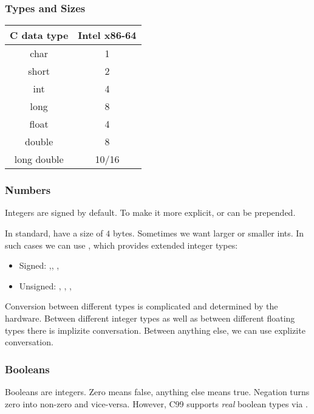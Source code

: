 \subsubsection{Types and Sizes}
\begin{table}[H]
    \centering
    \begin{tabular}{c c}
        C data type & Intel x86-64\\
        \hline
        char & 1\\
        short & 2\\
        int & 4\\
        long & 8\\
        float & 4\\
        double & 8\\
        long double & 10/16\\
    \end{tabular}
\end{table}

\subsubsection{Numbers}
Integers are signed by default. To make it more explicit,  or  can be prepended.

In standard,  have a size of $4$ bytes. Sometimes we want larger or smaller ints. In such cases we can use , which provides extended integer types:
\begin{itemize}
    \item Signed: ,, , 
    \item Unsigned: , , , 
\end{itemize}

Conversion between different types is complicated and determined by the hardware. Between different integer types as well as between different floating types there is implizite conversation. Between anything else, we can use explizite conversation.

\subsubsection{Booleans}
Booleans are integers. Zero means false, anything else means true. Negation turns zero into non-zero and vice-versa. However, C99 supports \textit{real} boolean types via .

